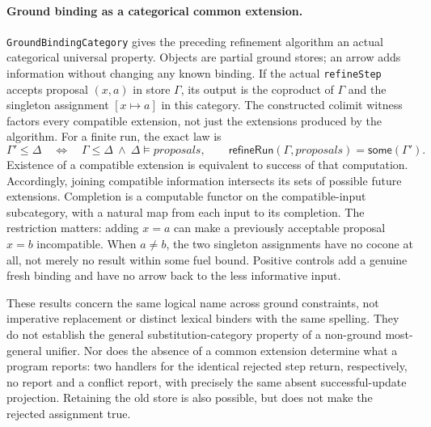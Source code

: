 \documentclass[11pt]{article}
\theoremstyle{definition}
\theoremstyle{remark}
\begin{document}
\paragraph{Ground binding as a categorical common extension.}
\texttt{GroundBindingCategory} gives the preceding refinement algorithm an
actual categorical universal property. Objects are partial ground stores;
an arrow adds information without changing any known binding. If the actual
\texttt{refineStep} accepts proposal $(x,a)$ in store $\Gamma$, its output is
the coproduct of $\Gamma$ and the singleton assignment $[x\mapsto a]$ in
this category. The constructed colimit witness factors every compatible
extension, not just the extensions produced by the algorithm. For a finite
run, the exact law is
\[
 \Gamma'\leq\Delta
 \quad\Longleftrightarrow\quad
 \Gamma\leq\Delta\ \land\ \Delta\models\textit{proposals},
 \qquad
 \mathsf{refineRun}(\Gamma,\textit{proposals})=\mathsf{some}(\Gamma').
\]
Existence of a compatible extension is equivalent to success of that
computation. Accordingly, joining compatible information intersects its
sets of possible future extensions. Completion is a computable functor on
the compatible-input subcategory, with a natural map from each input to its
completion. The restriction matters: adding $x=a$ can make a previously
acceptable proposal $x=b$ incompatible. When $a\ne b$, the two singleton
assignments have no cocone at all, not merely no result within some fuel
bound. Positive controls add a genuine fresh binding and have no arrow back
to the less informative input.

These results concern the same logical name across ground constraints, not
imperative replacement or distinct lexical binders with the same spelling.
They do not establish the general substitution-category property of a
non-ground most-general unifier. Nor does the absence of a common extension
determine what a program reports: two handlers for the identical rejected
step return, respectively, no report and a conflict report, with precisely
the same absent successful-update projection. Retaining the old store is
also possible, but does not make the rejected assignment true.
\end{document}
